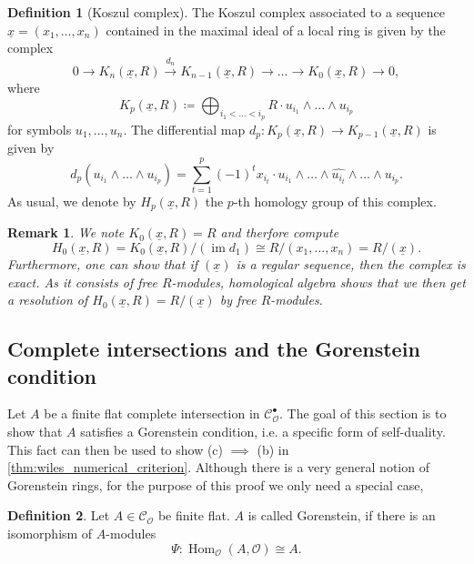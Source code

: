\documentclass{article}
\theoremstyle{plain}%
\newtheorem{remark}{Remark}[section]
\theoremstyle{definition}
\newtheorem{definition}{Definition}[section]
\theoremstyle{remark}
\newcommand{\cob}{\mathcal{C}_\mathcal{O}^\bullet}
\newcommand{\co}{\mathcal{C}_\mathcal{O}}
\newcommand{\im}{\operatorname{im}}
\renewcommand{\hom}{\operatorname{Hom}}
\begin{document}
\begin{definition}[Koszul complex]
    The Koszul complex associated to a sequence \(\underline{x} = (x_1, \dots, x_n)\) contained in the maximal ideal
    of a local ring is given by the complex
    \[
        0 \to K_n(\underline{x}, R) \xrightarrow{d_n} K_{n-1}(\underline{x}, R) \to \dots \to K_{0}(\underline{x},R) \to 0,
    \]
    where 
    \[
        K_p(\underline{x}, R) \coloneqq \bigoplus_{i_1 < \dots < i_p} R \cdot u_{i_1}\wedge\dots\wedge u_{i_p}
    \]
    for symbols \(u_1, \dots, u_n\). The differential map \(d_p\colon K_p(\underline{x}, R) \to K_{p-1}(\underline{x}, R)\)
    is given by
    \[
        d_p(u_{i_1}\wedge\dots\wedge u_{i_p}) = \sum_{t=1}^p(-1)^t x_{i_t} \cdot 
        u_{i_1} \wedge \dots \wedge \widehat{u_{i_t}}\wedge \dots \wedge u_{i_p}.
    \]
    As usual, we denote by \(H_p(\underline{x}, R)\) the \(p\)-th homology group of this complex.
\end{definition}

\begin{remark}
    We note \(K_0(\underline{x}, R) = R\) and therfore compute
    \[
        H_0(\underline{x}, R) = K_0(\underline{x}, R)/(\im d_1) \cong R/(x_1, \dots, x_n) = R/(\underline{x}).
    \]
    Furthermore, one can show that if \((\underline{x})\) is a regular sequence, then the complex is exact.
    As it consists of free \(R\)-modules, homological algebra shows that we then get a resolution of
    \(H_0(\underline{x}, R) = R/(\underline{x})\) by free \(R\)-modules. 
\end{remark}

\subsection{Complete intersections and the Gorenstein condition}
Let \(A\) be a finite flat complete intersection in \(\cob\). The goal of this section is to show that \(A\)
satisfies a Gorenstein condition, i.e. a specific form of self-duality.
This fact can then be used to show (c) \(\implies\) (b) in \cref{thm:wiles_numerical_criterion}.
Although there is a very general notion of Gorenstein rings, for
the purpose of this proof we only need a special case,
\begin{definition}
    Let \(A \in \co\) be finite flat. \(A\) is called Gorenstein, if there is an isomorphism of \(A\)-modules
    \[
        \Psi\colon \hom_\mathcal{O}(A, \mathcal{O}) \cong A.
    \]
\end{definition}
\end{document}
